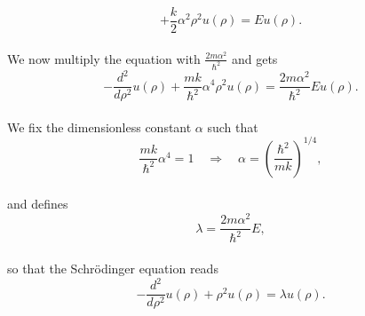 \documentclass[12pt]{article}
\begin{document}
\begin{flushleft}
\begin{equation}
       + \frac{k}{2} \alpha^2\rho^2u(\rho)  = E u(\rho) .
\end{equation}\\
\vspace{5mm}
We now multiply the equation with $\frac{2m\alpha^2}{\hbar^2}$ and gets\\
\vspace{5mm}
$$-\frac{d^2}{d\rho^2} u(\rho) 
       + \frac{mk}{\hbar^2} \alpha^4\rho^2u(\rho)  = \frac{2m\alpha^2}{\hbar^2}E u(\rho).$$\\
\vspace{5mm}
We fix the dimensionless constant $\alpha$ such that\\
\vspace{5mm}
$$\frac{mk}{\hbar^2} \alpha^4 = 1\quad\Rightarrow\quad \alpha = \left(\frac{\hbar^2}{mk}\right)^{1/4},$$\\
\vspace{5mm}
and defines \\
\vspace{5mm}
$$\lambda = \frac{2m\alpha^2}{\hbar^2}E,$$\\
\vspace{5mm}
so that the Schr\"odinger equation reads\\
\vspace{5mm}
\begin{equation}\label{eq:SL}
-\frac{d^2}{d\rho^2} u(\rho) + \rho^2u(\rho)  = \lambda u(\rho).
\end{equation}\\
\newpage


\end{flushleft}
\end{document}

